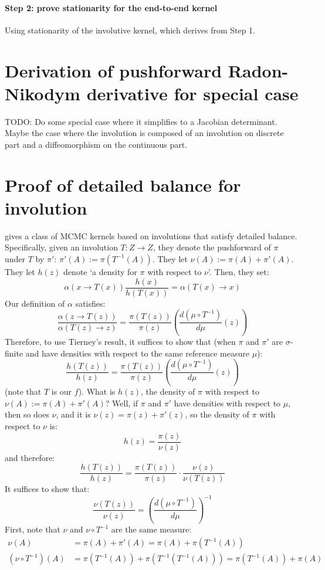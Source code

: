 \documentclass[twoside]{article}
\begin{document}
\paragraph{Step 2: prove stationarity for the end-to-end kernel}
Using stationarity of the involutive kernel, which derives from Step 1.

\section{Derivation of pushforward Radon-Nikodym derivative for special case}
TODO: Do some special case where it simplifies to a Jacobian determinant.
Maybe the case where the involution is composed of an involution on discrete part and a diffeomorphism on the continuous part.

\section{Proof of detailed balance for involution}
\citet{tierney1998note} gives a class of MCMC kernels based on involutions that satisfy detailed balance.
Specifically, given an involution $T : Z \to Z$, they denote the pushforward of $\pi$ under $T$ by $\pi'$:
$\pi'(A) := \pi(T^{-1}(A))$.
They let $\nu(A) := \pi(A) + \pi'(A)$.
They let $h(z)$ denote `a density for $\pi$ with respect to $\nu$'.
Then, they set:
\[
\alpha(x \to T(x)) \frac{h(x)}{h(T(x))} = \alpha(T(x) \to x)
\]
Our definition of $\alpha$ satisfies:
\[
\frac{\alpha(z \to T(z))}{\alpha(T(z) \to z)} = \frac{\pi(T(z))}{\pi(z)} \left( \frac{d (\mu \circ T^{-1})}{d \mu} (z) \right)
\]
Therefore, to use Tierney's result, it suffices to show that (when $\pi$ and $\pi'$ are $\sigma$-finite and have densities with respect to the same reference measure $\mu$):
\[
\frac{h(T(z))}{h(z)}= \frac{\pi(T(z))}{\pi(z)} \left( \frac{d (\mu \circ T^{-1})}{d \mu} (z) \right)
\]
(note that $T$ is our $f$).
What is $h(z)$, the density of $\pi$ with respect to $\nu(A) := \pi(A) + \pi'(A)$?
Well, if $\pi$ and $\pi'$ have densities with respect to $\mu$, then so does $\nu$, and it is $\nu(z) = \pi(z) + \pi'(z)$, so the density of $\pi$ with respect to $\nu$ is:
\[
h(z) = \frac{\pi(z)}{\nu(z)} %
\]
and therefore:
\[
\frac{h(T(z))}{h(z)} = \frac{\pi(T(z))}{\pi(z)} \cdot \frac{\nu(z)}{\nu(T(z))}
\]
It suffices to show that:
\[
\frac{\nu(T(z))}{\nu(z)} = \left( \frac{d (\mu \circ T^{-1})}{d \mu} \right)^{-1}
\]
First, note that $\nu$ and $\nu \circ T^{-1}$ are the same measure:
\begin{align}
\nu(A) &= \pi(A) + \pi'(A) = \pi(A) + \pi(T^{-1}(A))\\
(\nu \circ T^{-1})(A) &= \pi(T^{-1}(A)) + \pi(T^{-1}(T^{-1}(A))) = \pi(T^{-1}(A)) + \pi(A)
\end{align}
\end{document}
